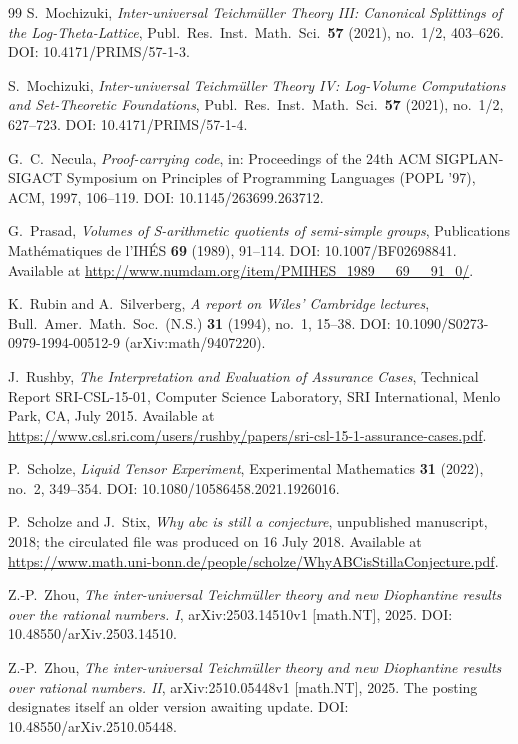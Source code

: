 \documentclass[11pt,a4paper]{article}
\begin{document}
\begin{thebibliography}{99}
S.~Mochizuki,
\emph{Inter-universal Teichmüller Theory III: Canonical Splittings
of the Log-Theta-Lattice},
Publ.\ Res.\ Inst.\ Math.\ Sci.\ \textbf{57} (2021), no.~1/2, 403--626.
DOI: 10.4171/PRIMS/57-1-3.

S.~Mochizuki,
\emph{Inter-universal Teichmüller Theory IV: Log-Volume
Computations and Set-Theoretic Foundations},
Publ.\ Res.\ Inst.\ Math.\ Sci.\ \textbf{57} (2021), no.~1/2, 627--723.
DOI: 10.4171/PRIMS/57-1-4.

G.~C.~Necula,
\emph{Proof-carrying code},
in: Proceedings of the 24th ACM SIGPLAN-SIGACT Symposium on Principles
of Programming Languages (POPL '97), ACM, 1997, 106--119.
DOI: 10.1145/263699.263712.

G.~Prasad,
\emph{Volumes of S-arithmetic quotients of semi-simple groups},
Publications Math\'{e}matiques de l'IH\'{E}S \textbf{69} (1989),
91--114.
DOI: 10.1007/BF02698841.
Available at \url{http://www.numdam.org/item/PMIHES_1989__69__91_0/}.

K.~Rubin and A.~Silverberg,
\emph{A report on Wiles' Cambridge lectures},
Bull.\ Amer.\ Math.\ Soc.\ (N.S.) \textbf{31} (1994), no.~1, 15--38.
DOI: 10.1090/S0273-0979-1994-00512-9 (arXiv:math/9407220).

J.~Rushby,
\emph{The Interpretation and Evaluation of Assurance Cases},
Technical Report SRI-CSL-15-01, Computer Science Laboratory,
SRI International, Menlo Park, CA, July 2015.
Available at
\url{https://www.csl.sri.com/users/rushby/papers/sri-csl-15-1-assurance-cases.pdf}.

P.~Scholze,
\emph{Liquid Tensor Experiment},
Experimental Mathematics \textbf{31} (2022), no.~2, 349--354.
DOI: 10.1080/10586458.2021.1926016.

P.~Scholze and J.~Stix,
\emph{Why abc is still a conjecture},
unpublished manuscript, 2018; the circulated file was produced on
16 July 2018.
Available at
\url{https://www.math.uni-bonn.de/people/scholze/WhyABCisStillaConjecture.pdf}.

Z.-P.~Zhou,
\emph{The inter-universal Teichmüller theory and new Diophantine
results over the rational numbers. I},
arXiv:2503.14510v1 [math.NT], 2025.
DOI: 10.48550/arXiv.2503.14510.

Z.-P.~Zhou,
\emph{The inter-universal Teichmüller theory and new Diophantine
results over rational numbers. II},
arXiv:2510.05448v1 [math.NT], 2025.
The posting designates itself an older version awaiting update.
DOI: 10.48550/arXiv.2510.05448.

\end{thebibliography}
\end{document}
